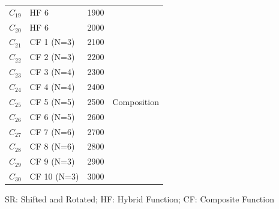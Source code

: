 \begin{table}[t]
\begin{tabular}{p{1in}   p{2in}   p{0.8in} p{0.9in}}
 $C_{19}$& HF  6  & 1900 & \\
 $C_{20}$& HF  6  & 2000 &  \\
\hline
$C_{21}$ & CF 1 (N=3) & 2100 &  \\
 $C_{22}$& CF 2 (N=3) & 2200 & \\
 $C_{23}$& CF 3 (N=4) & 2300 & \\
 $C_{24}$& CF 4 (N=4) & 2400 & \\
 $C_{25}$& CF 5 (N=5) & 2500 & Composition \\
 $C_{26}$& CF 6 (N=5) & 2600 & \\
 $C_{27}$& CF 7 (N=6) & 2700 & \\
 $C_{28}$& CF 8 (N=6) & 2800 & \\
 $C_{29}$& CF 9 (N=3) & 2900 & \\
 $C_{30}$& CF 10 (N=3) & 3000 &  \\
\hline
\end{tabular}


SR: Shifted and Rotated; HF: Hybrid Function; CF: Composite Function
\label{tab:CEC2017}
\end{table}

